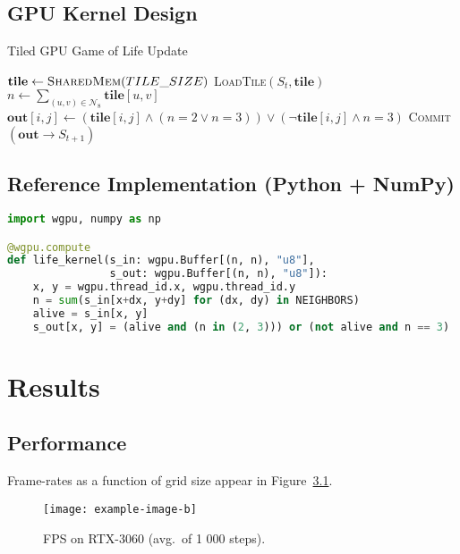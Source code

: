 \documentclass{report}
\begin{document}
\section{GPU Kernel Design}
\begin{algorithm}
  \caption{Tiled GPU Game of Life Update}\label{alg:gpu-life}
  \begin{algorithmic}[1]
      \State $\textbf{tile} \gets \textsc{SharedMem}(TILE\_SIZE)$
      \State \textsc{LoadTile}$(S_t,\textbf{tile})$
      \Statex
        \State $n \gets \sum_{(u,v)\in\mathcal N_8} \textbf{tile}[u,v]$
        \State $\textbf{out}[i,j] \gets 
               ( \textbf{tile}[i,j] \wedge (n\!=\!2 \vee n\!=\!3))
               \vee (\lnot\textbf{tile}[i,j] \wedge n\!=\!3)$
      \EndFor
      \State \textsc{Commit}$(\textbf{out}\rightarrow S_{t+1})$
    \EndProcedure
  \end{algorithmic}
\end{algorithm}

\section{Reference Implementation (Python + NumPy)}
\begin{lstlisting}[language=Python,caption={Python: WebGPU Life Step},label={lst:py-life}]
import wgpu, numpy as np

@wgpu.compute
def life_kernel(s_in: wgpu.Buffer[(n, n), "u8"],
                s_out: wgpu.Buffer[(n, n), "u8"]):
    x, y = wgpu.thread_id.x, wgpu.thread_id.y
    n = sum(s_in[x+dx, y+dy] for (dx, dy) in NEIGHBORS)
    alive = s_in[x, y]
    s_out[x, y] = (alive and (n in (2, 3))) or (not alive and n == 3)
\end{lstlisting}

\chapter{Results}
\section{Performance}
Frame-rates as a function of grid size appear in
Figure~\cref{fig:fps-performance}.

\begin{figure}[ht]
  \centering
  \texttt{[image: example-image-b]}
  \caption{FPS on RTX-3060 (avg.\ of 1 000 steps).}
  \label{fig:fps-performance}
\end{figure}
\end{document}

